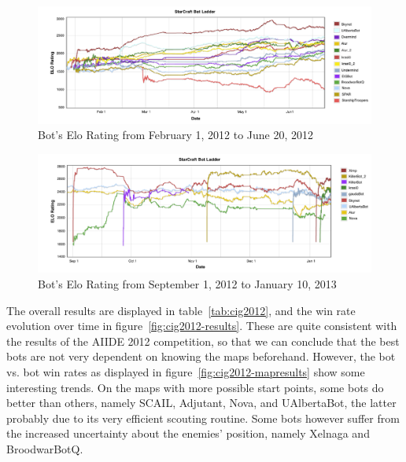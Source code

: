 \documentclass[journal]{IEEEtran}
\begin{document}
\begin{figure}[tb]
    \centering
    \includegraphics[width=\textwidth]{figures/botLadder1.pdf}
    \caption{Bot's Elo Rating from February 1, 2012 to June 20, 2012}
    \label{fig:botLadder1}
\end{figure}

\begin{figure}[tb]
    \centering
    \includegraphics[width=\textwidth]{figures/botLadder2.pdf}
    \caption{Bot's Elo Rating from September 1, 2012 to January 10, 2013}
    \label{fig:botLadder2}
\end{figure}

The overall results are displayed in table~\ref{tab:cig2012},
and the win rate evolution over time in figure~\ref{fig:cig2012-results}.
These are quite consistent with the results of the AIIDE 2012 competition,
so that we can conclude that the best bots are not very dependent on 
knowing the maps beforehand. However, the bot vs. bot win rates as
displayed in figure~\ref{fig:cig2012-mapresults} show some interesting
trends. On the maps with more possible start points, some bots do 
better than others, namely SCAIL, Adjutant, Nova, and UAlbertaBot,
the latter probably due to its very efficient scouting routine.
Some bots however suffer from the increased uncertainty about
the enemies' position, namely Xelnaga and BroodwarBotQ.
\end{document}
